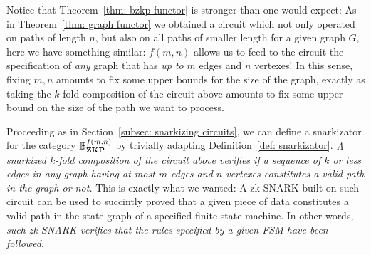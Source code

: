 \documentclass[preliminary,copyright,creativecommons,sharealike,noncommercial]{eptcs}
\begin{document}
%
Notice that Theorem~\ref{thm: bzkp functor} is stronger than 
one would expect: As in Theorem~\ref{thm: graph functor} we obtained
a circuit which not only operated on paths of length $n$, but also on all 
paths of smaller length for a given graph $G$, 
here we have something similar: $f(m,n)$ allows us to
feed  to the circuit the specification of \emph{any} graph
that has \emph{up to} $m$ edges and $n$ vertexes! In this sense, 
fixing $m,n$ amounts to fix some upper bounds for the size 
of the graph, exactly as taking the $k$-fold composition of 
the circuit above amounts to fix some upper bound on the size 
of the path we want to process.

Proceeding as in Section~\ref{subsec: snarkizing circuits}, we can 
define a snarkizator for the category $\mathbb{B}^{f(m,n)}_\textbf{ZKP}$ by trivially 
adapting Definition~\ref{def: snarkizator}. \emph{A snarkized $k$-fold 
composition of the circuit above verifies if a sequence of $k$ or less 
edges in any graph having at most $m$ edges and $n$ vertexes constitutes 
a valid path in the graph or not.} This is exactly what we wanted: 
A zk-SNARK built on such circuit can be used to succintly proved that 
a given piece of data constitutes a valid path in the state graph of a 
specified finite state machine. In other words, \emph{such zk-SNARK
verifies that the rules specified by a given FSM have been followed}.
\end{document}
